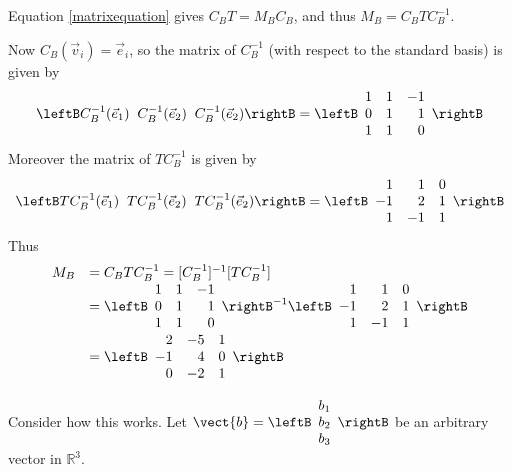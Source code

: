 \begin{solution}

Equation  \ref{matrixequation}  gives $ C_BT=M_{B}C_B$, and thus 
$M_{B} = C_BTC^{-1}_B$. 

Now $C_B(\vec{v}_i) = \vec{e}_i$, so the matrix of $C_B^{-1}$ (with respect to the standard basis) is given by
\[ \leftB  C_B^{-1}(\vec{e}_1) \;\; C_B^{-1}(\vec{e}_2) \;\; C_B^{-1}(\vec{e}_2) \rightB =  
\leftB 
\begin{array}{rrr}
1 & 1 & -1 \\ 
0 & 1 & 1 \\ 
1 & 1 & 0
\end{array}
\rightB
\]
Moreover the matrix of  $T C_B^{-1}$ is given by 
\[ \leftB  TC_B^{-1}(\vec{e}_1) \;\; TC_B^{-1}(\vec{e}_2) \;\; TC_B^{-1}(\vec{e}_2) \rightB =  
\leftB
\begin{array}{rrr}
1 & 1 & 0 \\ 
-1 & 2 & 1 \\ 
1 & -1 & 1
\end{array}
\rightB
\]
Thus 
\[ \begin{array}{ll}
M_{B} & =  C_BTC^{-1}_B =  [C^{-1}_B]^{-1} [TC^{-1}_B] \\
	& = 
\leftB
\begin{array}{rrr}
1 & 1 & -1 \\ 
0 & 1 & 1 \\ 
1 & 1 & 0
\end{array}
\rightB ^{-1}\leftB 
\begin{array}{rrr}
1 & 1 & 0 \\ 
-1 & 2 & 1 \\ 
1 & -1 & 1
\end{array}
\rightB \\
&=\leftB 
\begin{array}{rrr}
2 & -5 & 1 \\ 
-1 & 4 & 0 \\ 
0 & -2 & 1
\end{array}
\rightB
\end{array}
\]


Consider how this works. Let $\vect{b} = \leftB
\begin{array}{r}
b_1 \\
b_2 \\
b_3
\end{array}
\rightB$ be an arbitrary vector in $\mathbb{R}^3$. 


\end{solution}
